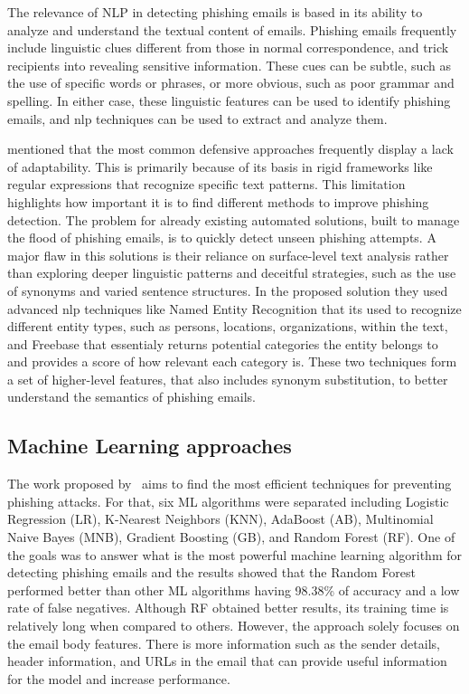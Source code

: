 The relevance of NLP in detecting phishing emails is based in its ability to analyze and understand the textual content of emails. Phishing emails frequently include linguistic clues different from those in normal correspondence, and trick recipients into revealing sensitive information. These cues can be subtle, such as the use of specific words or phrases, or more obvious, such as poor grammar and spelling. In either case, these linguistic features can be used to identify phishing emails, and \ac{nlp} techniques can be used to extract and analyze them.

\citet{Gutierrez2018988} mentioned that the most common defensive approaches frequently display a lack of adaptability. This is primarily because of its basis in rigid frameworks like regular expressions that recognize specific text patterns. This limitation highlights how important it is to find different methods to improve phishing detection. The problem for already existing automated solutions, built to manage the flood of phishing emails, is to quickly detect unseen phishing attempts. A major flaw in this solutions is their reliance on surface-level text analysis rather than exploring deeper linguistic patterns and deceitful strategies, such as the use of synonyms and varied sentence structures.
In the proposed solution they used advanced \ac{nlp} techniques like Named Entity Recognition that its used to recognize different entity types, such as persons, locations, organizations, within the text, and Freebase that essentialy returns potential categories the entity belongs to and provides a score of how relevant each category is. These two techniques form a set of higher-level features, that also includes synonym substitution, to better understand the semantics of phishing emails.


\subsection{Machine Learning approaches}


The work proposed by~\citet{rabbi2023phishy} aims to find the most efficient techniques for preventing phishing attacks. For that, six ML algorithms were separated including Logistic Regression (LR), K-Nearest Neighbors (KNN), AdaBoost (AB), Multinomial Naive Bayes (MNB), Gradient Boosting (GB), and Random Forest (RF). One of the goals was to answer what is the most powerful machine learning algorithm for detecting phishing emails and the results showed that the Random Forest performed better than other ML algorithms having 98.38\% of accuracy and a low rate of false negatives. Although RF obtained better results, its training time is relatively long when compared to others. However, the approach solely focuses on the email body features. There is more information such as the sender details, header information, and URLs in the email that can provide useful information for the model and increase performance.

